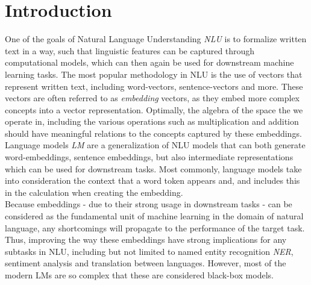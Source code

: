 \documentclass[a4paper,12pt,twoside,openright]{report}
\begin{document}
\pagestyle{empty}
\singlespacing

\onehalfspacing

\singlespacing


\setcounter{page}{0}
\pagestyle{plain}
\tableofcontents
\listoffigures
\listoftables

\onehalfspacing

\newcommand{\norm}[1]{\left\lVert#1\right\rVert}
\newcommand{\bracket}[1]{\left|#1\right|}
\newcommand{\absdet}[1]{\left|#1\right|}
\newcommand{\bftab}{\fontseries{b}\selectfont}

\newcolumntype{b}{X}

\setcounter{page}{1} 

\newpage
\chapter{Introduction}
 
One of the goals of Natural Language Understanding \textit{NLU} is to formalize written text in a way, such that linguistic features can be captured through computational models, which can then again be used for downstream machine learning tasks.
The most popular methodology in NLU is the use of vectors that represent written text, including word-vectors, sentence-vectors and more. 
These vectors are often referred to as \textit{embedding} vectors, as they embed more complex concepts into a vector representation.
Optimally, the algebra of the space the we operate in, including the various operations such as multiplication and addition should have meaningful relations to the concepts captured by these embeddings. \\

Language models \textit{LM} are a generalization of NLU models that can both generate word-embeddings, sentence embeddings, but also intermediate representations which can be used for downstream tasks.
Most commonly, language models take into consideration the context that a word token appears and, and includes this in the calculation when creating the embedding. \\

Because embeddings - due to their strong usage in downstream tasks - can be considered as the fundamental unit of machine learning in the domain of natural language, any shortcomings will propagate to the performance of the target task.
Thus, improving the way these embeddings have strong implications for any subtasks in NLU, including but not limited to named entity recognition \textit{NER}, sentiment analysis and translation between languages. 
However, most of the modern LMs are so complex that these are considered black-box models.
\\
\end{document}
